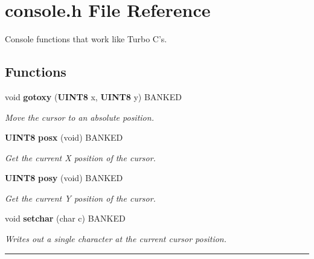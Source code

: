 \section{console.h File Reference}
\label{console.h}
Console functions that work like Turbo C's. 


\subsection*{Functions}
\begin{CompactItemize}
\item 
\label{console.h_a0}
void {\bf gotoxy} ({\bf UINT8} x, {\bf UINT8} y) BANKED
\begin{CompactList}\small\item\em Move the cursor to an absolute position.\item\end{CompactList}

\item 
\label{console.h_a1}
{\bf UINT8} {\bf posx} (void) BANKED
\begin{CompactList}\small\item\em Get the current X position of the cursor.\item\end{CompactList}

\item 
\label{console.h_a2}
{\bf UINT8} {\bf posy} (void) BANKED
\begin{CompactList}\small\item\em Get the current Y position of the cursor.\item\end{CompactList}

\item 
void {\bf setchar} (char c) BANKED
\begin{CompactList}\small\item\em Writes out a single character at the current cursor position.\item\end{CompactList}

\end{CompactItemize}
\vspace{0.4cm}\hrule\vspace{0.2cm}
